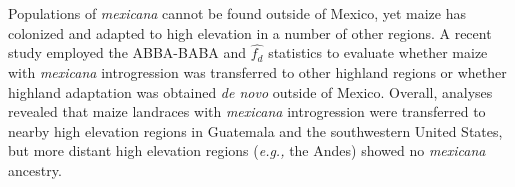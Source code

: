 \documentclass[11pt]{article}
\begin{document}
\begin{enumerate}
Populations of \emph{mexicana} cannot be found outside of Mexico, yet maize has colonized and adapted to high elevation in a number of other regions.
A recent study \cite{wang2017} employed the ABBA-BABA and $\hat{f_{d}}$ statistics to evaluate whether maize with \emph{mexicana} introgression was transferred to other highland regions or whether highland adaptation was obtained \emph{de novo} outside of Mexico.
Overall, analyses revealed that maize landraces with \emph{mexicana} introgression were transferred to nearby high elevation regions in Guatemala and the southwestern United States, but more distant high elevation regions (\emph{e.g.,} the Andes) showed no \emph{mexicana} ancestry. 



\end{enumerate}
\end{document}
